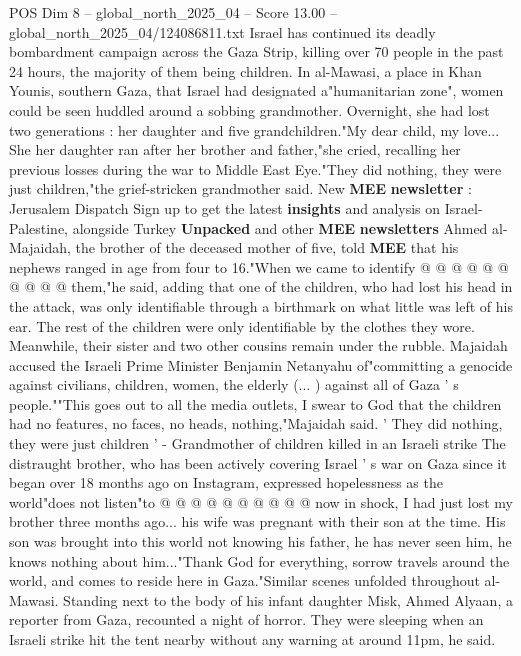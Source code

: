 \begin{textsample}{POS Dim 8 – global\_north\_2025\_04 – Score 13.00 – global\_north\_2025\_04/124086811.txt}  \label{ex:f8_pos_027}
Israel has continued its deadly bombardment campaign across the Gaza Strip, killing over 70 people in the past 24 hours, the majority of them being children.
In al-Mawasi, a place in Khan Younis, southern Gaza, that Israel had designated a"humanitarian zone", women could be seen huddled around a sobbing grandmother.
Overnight, she had lost two generations : her daughter and five grandchildren."My dear child, my love...
She her daughter ran after her brother and father,"she cried, recalling her previous losses during the war to Middle East Eye."They did nothing, they were just children,"the grief-stricken grandmother said.
New \textbf{MEE} \textbf{newsletter} : Jerusalem Dispatch Sign up to get the latest \textbf{insights} and analysis on Israel-Palestine, alongside Turkey \textbf{Unpacked} and other \textbf{MEE} \textbf{newsletters} Ahmed al-Majaidah, the brother of the deceased mother of five, told \textbf{MEE} that his nephews ranged in age from four to 16."When we came to identify @ @ @ @ @ @ @ @ @ @ them,"he said, adding that one of the children, who had lost his head in the attack, was only identifiable through a birthmark on what little was left of his ear.
The rest of the children were only identifiable by the clothes they wore.
Meanwhile, their sister and two other cousins remain under the rubble.
Majaidah accused the Israeli Prime Minister Benjamin Netanyahu of"committing a genocide against civilians, children, women, the elderly (... ) against all of Gaza ' s people.""This goes out to all the media outlets, I swear to God that the children had no features, no faces, no heads, nothing,"Majaidah said. ' They did nothing, they were just children ' - Grandmother of children killed in an Israeli strike The distraught brother, who has been actively covering Israel ' s war on Gaza since it began over 18 months ago on Instagram, expressed hopelessness as the world"does not listen"to @ @ @ @ @ @ @ @ @ @ now in shock, I had just lost my brother three months ago... his wife was pregnant with their son at the time.
His son was brought into this world not knowing his father, he has never seen him, he knows nothing about him..."Thank God for everything, sorrow travels around the world, and comes to reside here in Gaza."Similar scenes unfolded throughout al-Mawasi.
Standing next to the body of his infant daughter Misk, Ahmed Alyaan, a reporter from Gaza, recounted a night of horror.
They were sleeping when an Israeli strike hit the tent nearby without any warning at around 11pm, he said.

\end{textsample}
